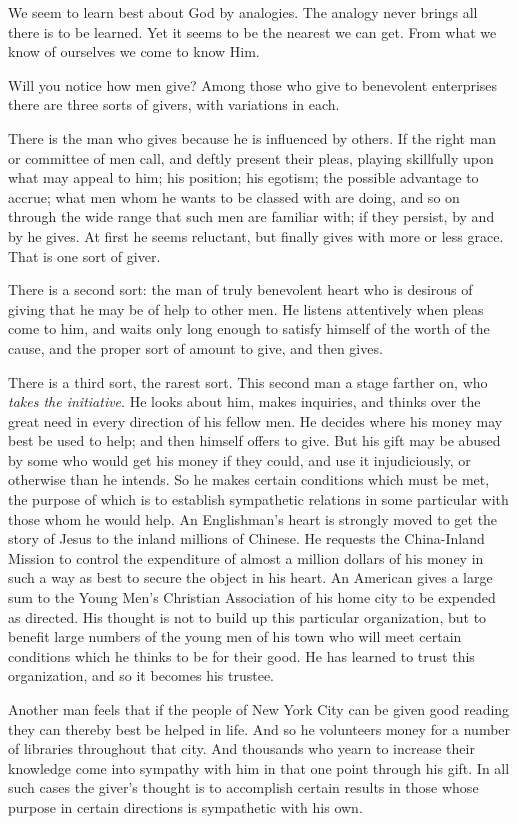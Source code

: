 We seem to learn best about God by analogies. The analogy never brings all
there is to be learned. Yet it seems to be the nearest we can get. From
what we know of ourselves we come to know Him.

Will you notice how men give? Among those who give to benevolent
enterprises there are three sorts of givers, with variations in each.

There is the man who gives because he is influenced by others. If the
right man or committee of men call, and deftly present their pleas,
playing skillfully upon what may appeal to him; his position; his egotism;
the possible advantage to accrue; what men whom he wants to be classed
with are doing, and so on through the wide range that such men are
familiar with; if they persist, by and by he gives. At first he seems
reluctant, but finally gives with more or less grace. That is one sort of
giver.

There is a second sort: the man of truly benevolent heart who is desirous
of giving that he may be of help to other men. He listens attentively when
pleas come to him, and waits only long enough to satisfy himself of the
worth of the cause, and the proper sort of amount to give, and then gives.

There is a third sort, the rarest sort. This second man a stage farther
on, who \textit{takes the initiative}. He looks about him, makes inquiries, and
thinks over the great need in every direction of his fellow men. He
decides where his money may best be used to help; and then himself offers
to give. But his gift may be abused by some who would get his money if
they could, and use it injudiciously, or otherwise than he intends. So he
makes certain conditions which must be met, the purpose of which is to
establish sympathetic relations in some particular with those whom he
would help. An Englishman's heart is strongly moved to get the story of
Jesus to the inland millions of Chinese. He requests the China-Inland
Mission to control the expenditure of almost a million dollars of his
money in such a way as best to secure the object in his heart. An American
gives a large sum to the Young Men's Christian Association of his home
city to be expended as directed. His thought is not to build up this
particular organization, but to benefit large numbers of the young men of
his town who will meet certain conditions which he thinks to be for their
good. He has learned to trust this organization, and so it becomes his
trustee.

Another man feels that if the people of New York City can be given good
reading they can thereby best be helped in life. And so he volunteers
money for a number of libraries throughout that city. And thousands who
yearn to increase their knowledge come into sympathy with him in that one
point through his gift. In all such cases the giver's thought is to
accomplish certain results in those whose purpose in certain directions is
sympathetic with his own.

